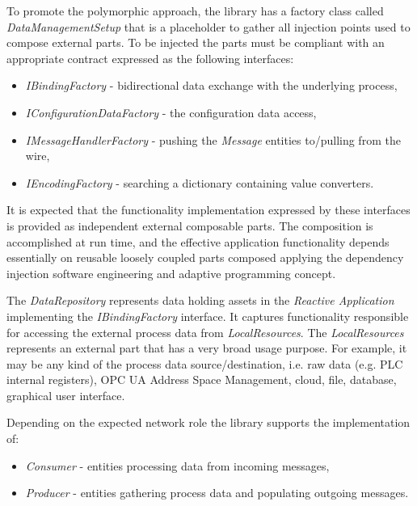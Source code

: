 \documentclass{jacsart}
\begin{document}
To promote the polymorphic approach, the library has a factory class called \emph{DataManagementSetup} that is a placeholder to gather all injection points used to compose external parts. To be injected the parts must be compliant with an appropriate contract expressed as the following interfaces:

\begin{itemize}
      \item \emph{IBindingFactory} - bidirectional data exchange with the underlying process,
      \item \emph{IConfigurationDataFactory} - the configuration data access,
      \item \emph{IMessageHandlerFactory} - pushing the \emph{Message} entities to/pulling from the wire,
      \item \emph{IEncodingFactory} - searching a dictionary containing value converters.
\end{itemize}

It is expected that the functionality implementation expressed by these interfaces is provided as independent external composable parts. The composition is accomplished at run time, and the effective application functionality depends essentially on reusable loosely coupled parts composed applying the dependency injection software engineering and adaptive programming concept. 

The \textit{DataRepository} represents data holding assets in the \textit{Reactive Application} implementing the \textit{IBindingFactory} interface. It captures functionality responsible for accessing the external process data from \textit{LocalResources}. The \textit{LocalResources} represents an external part that has a very broad usage purpose. For example, it may be any kind of the process data source/destination, i.e. raw data (e.g. PLC internal registers), OPC UA Address Space Management, cloud, file, database, graphical user interface.

Depending on the expected network role the library supports the implementation of:

\begin{itemize}
      \item \textit{Consumer} - entities processing data from incoming messages,
      \item \textit{Producer} - entities gathering process data and populating outgoing messages.
\end{itemize}
\end{document}
